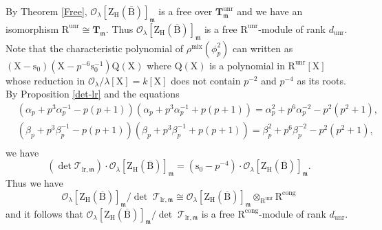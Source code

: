 \documentclass[10pt]{amsart}
\numberwithin{equation}{section}
\theoremstyle{definition}
\def\lr{\mathrm{lr}}
\def\mix{\mathrm{mix}}
\def\calO{\mathcal{O}}
\def\calT{\mathcal{T}}
\def\fracm{\mathfrak{m}}
\def\bfT{\mathbf{T}}
\def\rms{\mathrm{s}}
\def\rmB{\mathrm{B}}
\def\rmH{\mathrm{H}}
\def\rmQ{\mathrm{Q}}
\def\rmR{\mathrm{R}}
\def\rmX{\mathrm{X}}
\def\rmZ{\mathrm{Z}}
\def\unr{\mathrm{unr}}
\begin{document}
By Theorem \ref{Free},  $\calO_{\lambda}[\rmZ_{\rmH}(\overline{\rmB})]_{\fracm}$ is a free over $\bfT^{\unr}_{\fracm}$ and we have an isomorphism $\rmR^{\unr}\cong \bfT_{\fracm}$. Thus $\calO_{\lambda}[\rmZ_{\rmH}(\overline{\rmB})]_{\fracm}$ is a free $\rmR^{\unr}$-module of rank $d_{\unr}$. Note that the characteristic polynomial of $\rho^{\mix}(\phi^{2}_{p})$ can written as $(\rmX-\rms_{0})(\rmX-p^{-6}\rms^{-1}_{0})\rmQ(\rmX)$ where $\rmQ(\rmX)$ is a polynomial in $\rmR^{\unr}[\rmX]$ whose reduction in $\calO_{\lambda}/\lambda[\rmX]=k[\rmX]$ does not contain $p^{-2}$ and $p^{-4}$ as its roots. By Proposition \ref{det-lr} and the equations
\begin{equation*}
\begin{aligned}
&(\alpha_{p}+p^{3}\alpha^{-1}_{p}- p(p+1))(\alpha_{p}+p^{3}\alpha^{-1}_{p}+p(p+1))=\alpha^{2}_{p}+p^{6}\alpha^{-2}_{p}- p^{2}(p^{2}+1),\\
&(\beta_{p}+p^{3}\beta^{-1}_{p}-p(p+1))(\beta_{p}+p^{3}\beta^{-1}_{p}+p(p+1))=\beta^{2}_{p}+p^{6}\beta^{-2}_{p}- p^{2}(p^{2}+1),\\
\end{aligned}
\end{equation*}
we have 
\begin{equation*}
(\det\calT_{\lr, \fracm})\cdot\calO_{\lambda}[\rmZ_{\rmH}(\overline{\rmB})]_{\fracm}=(\rms_{0}-p^{-4})\cdot\calO_{\lambda}[\rmZ_{\rmH}(\overline{\rmB})]_{\fracm}.
\end{equation*}
Thus we have
\begin{equation*}
\calO_{\lambda}[\rmZ_{\rmH}(\overline{\rmB})]_{\fracm}/\det\phantom{.}\calT_{\lr,\fracm}\cong \calO_{\lambda}[\rmZ_{\rmH}(\overline{\rmB})]_{\fracm}\otimes_{\rmR^{\unr}}\rmR^{\mathrm{cong}}
\end{equation*}
and it follows that $\calO_{\lambda}[\rmZ_{\rmH}(\overline{\rmB})]_{\fracm}/\det\phantom{.}\calT_{\lr,\fracm}$ is a free $\rmR^{\mathrm{cong}}$-module of rank $d_{\unr}$.
\end{document}

